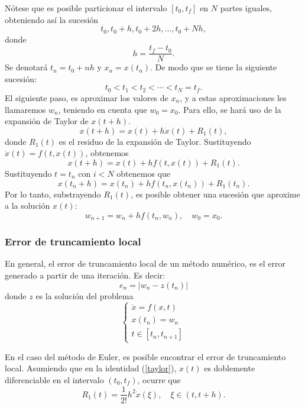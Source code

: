 Nótese que es posible particionar el intervalo $[t_0, t_f]$ en $N$ partes iguales, obteniendo así la sucesión 
$$t_0, t_0 + h, t_0 + 2h, ... , t_0 + Nh,$$
donde
$$h = \frac{t_f - t_0}{N}.$$
Se denotará $t_n = t_0 + nh$ y  $x_n = x(t_n)$. De modo que se tiene la siguiente sucesión:
\begin{equation}
    t_0 < t_1 < t_2 < \cdots < t_N = t_f.
\end{equation}
El siguiente paso, es aproximar los valores de $x_n$, y a estas aproximaciones les llamaremos $w_n$, teniendo en cuenta que $w_0 = x_0$. Para ello, se hará uso de la expansión de Taylor de $x(t + h)$.
\begin{equation}
    \label{taylor}
    x(t + h) = x(t) + h\dot x(t) + R_1(t),
\end{equation}
donde $R_1(t)$ es el residuo de la expansión de Taylor. Sustituyendo $\dot x(t) = f(t, x(t))$, obtenemos 
\begin{equation}
    x(t+h) = x(t) + hf(t,x(t)) + R_1(t).
\end{equation}
Sustituyendo $t = t_n$ con $i < N$ obtenemos que
\begin{equation}
    x(t_n + h) = x(t_n) + hf(t_n, x(t_n)) + R_1(t_n).
\end{equation}
Por lo tanto, substrayendo $R_1(t)$, es posible obtener una sucesión que aproxime a la solución $x(t)$:
\begin{equation}
    w_{n+1} = w_n + hf(t_n, w_n), \quad w_0 = x_0.
\end{equation} 

\subsubsection{Error de truncamiento local}
En general, el error de truncamiento local de un método numérico, es el error generado a partir de una iteración. Es decir:
\begin{equation}
    e_n = |w_n - z(t_n)|
\end{equation}
donde $z$ es la solución del problema 
\begin{equation}
    \left\{
    \begin{matrix}
        \dot x = f(x,t) \\
        x(t_n) = w_n \\
        t \in [t_n, t_{n+1}]
    \end{matrix}    
    \right.
\end{equation}

En el caso del método de Euler, es posible encontrar el error de truncamiento local. Asumiendo que en la identidad (\ref{taylor}), $x(t)$ es doblemente diferenciable en el intervalo $(t_0, t_f)$, ocurre que
\begin{equation}
    R_1(t) = \frac{1}{2!} h^2\dot x(\xi),  \quad \xi\in (t, t+h).
\end{equation}
